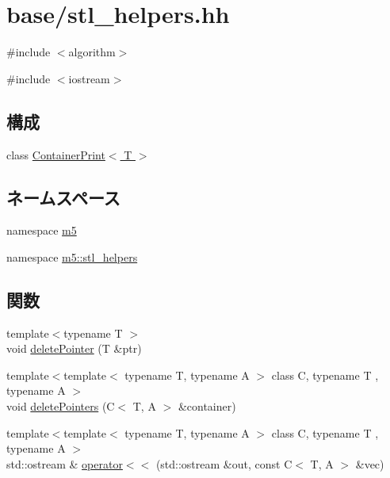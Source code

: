 \hypertarget{stl__helpers_8hh}{
\section{base/stl\_\-helpers.hh}
\label{stl__helpers_8hh}
}
{\ttfamily \#include $<$algorithm$>$}\par
{\ttfamily \#include $<$iostream$>$}\par
\subsection*{構成}
\begin{DoxyCompactItemize}
\item 
class \hyperlink{classm5_1_1stl__helpers_1_1ContainerPrint}{ContainerPrint$<$ T $>$}
\end{DoxyCompactItemize}
\subsection*{ネームスペース}
\begin{DoxyCompactItemize}
\item 
namespace \hyperlink{namespacem5}{m5}
\item 
namespace \hyperlink{namespacem5_1_1stl__helpers}{m5::stl\_\-helpers}
\end{DoxyCompactItemize}
\subsection*{関数}
\begin{DoxyCompactItemize}
\item 
{\footnotesize template$<$typename T $>$ }\\void \hyperlink{namespacem5_1_1stl__helpers_af96752cbf82aaccfe191b44be2722265}{deletePointer} (T \&ptr)
\item 
{\footnotesize template$<$template$<$ typename T, typename A $>$ class C, typename T , typename A $>$ }\\void \hyperlink{namespacem5_1_1stl__helpers_a789891cb80a549639c232ca96afb3fe1}{deletePointers} (C$<$ T, A $>$ \&container)
\item 
{\footnotesize template$<$template$<$ typename T, typename A $>$ class C, typename T , typename A $>$ }\\std::ostream \& \hyperlink{namespacem5_1_1stl__helpers_acd4af6db82f09f20c07d0055dd78e2eb}{operator$<$$<$} (std::ostream \&out, const C$<$ T, A $>$ \&vec)
\end{DoxyCompactItemize}
